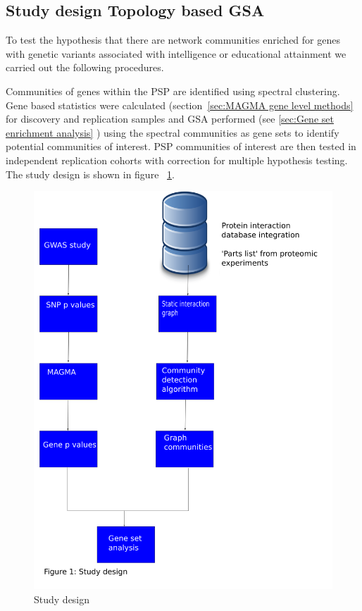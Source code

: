 \subsection{Study design Topology based GSA}
\label{sec:Study design topology based GSA}
To test the hypothesis that there are network communities enriched for genes with genetic variants associated with intelligence or educational attainment we carried out the following procedures.

Communities of genes within the PSP are identified using spectral clustering. Gene based statistics were calculated (section~\ref{sec:MAGMA gene level methods} for discovery and replication samples and GSA performed (see \ref{sec:Gene set enrichment analysis} ) using the spectral communities as gene sets to identify potential communities of interest. PSP communities of interest are then tested in independent replication cohorts with correction for multiple hypothesis testing. The study design is shown in figure ~\ref{fig:study design community detection}.

\begin{figure}
    \centering
    \includegraphics[width=\textwidth]{images/study_design.png}
    \caption{Study design}
    \label{fig:study design community detection}
\end{figure}

